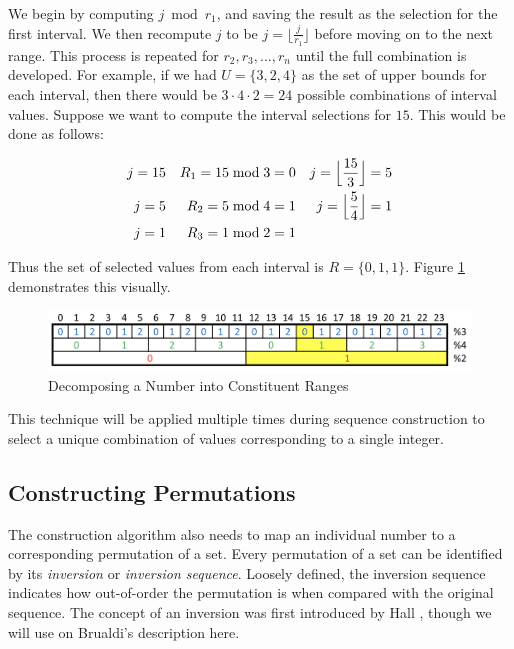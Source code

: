 We begin by computing $j \bmod r_1$, and saving the result as the selection for the first interval. We then recompute $j$ to be $j = \lfloor \frac{j}{r_1} \rfloor$ before moving on to the next range. This process is repeated for $r_2,r_3,...,r_n$ until the full combination is developed. For example, if we had $U = \{3, 2, 4\}$ as the set of upper bounds for each interval, then there would be $3 \cdot 4 \cdot 2 = 24$ possible combinations of interval values. Suppose we want to compute the interval selections for $15$. This would be done as follows:

\begin{align*}
j = 15   &&  R_1 = 15 \bmod 3 = 0  &&  j = \Bigl\lfloor \frac{15}{3} \Bigr\rfloor = 5   \\
j = 5    &&  R_2 = 5 \bmod 4 = 1   &&  j = \Bigl\lfloor \frac{5}{4} \Bigr\rfloor = 1    \\
j = 1    &&  R_3 = 1 \bmod 2 = 1   &&                                                   \\
\end{align*}

Thus the set of selected values from each interval is $R = \{0, 1, 1\}$. Figure \ref{fig:interval_breakdown} demonstrates this visually.

\begin{figure}[b]
\centering
\centerline{\includegraphics[origin=c,width=12cm]{../figures/interval-breakdown-final.png}}
\caption{Decomposing a Number into Constituent Ranges}
\label{fig:interval_breakdown}
\end{figure}

This technique will be applied multiple times during sequence construction to select a unique combination of values corresponding to a single integer.

\subsection{Constructing Permutations}

The construction algorithm also needs to map an individual number to a corresponding permutation of a set. Every permutation of a set can be identified by its \textit{inversion} or \textit{inversion sequence}. Loosely defined, the inversion sequence indicates how out-of-order the permutation is when compared with the original sequence. The concept of an inversion was first introduced by Hall \cite{hall_automorphisms_1962}, though we will use on Brualdi's description \cite{brualdi_introductory_2010} here.

